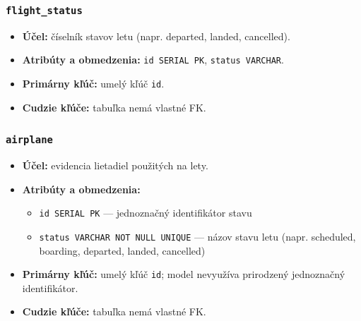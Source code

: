 \documentclass[11pt, a4paper]{article}
\begin{document}
\subsubsection*{\texttt{flight\_status}}
\begin{itemize}
    \item \textbf{Účel:} číselník stavov letu (napr. departed, landed, cancelled).
    \item \textbf{Atribúty a obmedzenia:} \texttt{id SERIAL PK}, \texttt{status VARCHAR}.
    \item \textbf{Primárny kľúč:} umelý kľúč \texttt{id}.
    \item \textbf{Cudzie kľúče:} tabuľka nemá vlastné FK.
\end{itemize}

\subsubsection*{\texttt{airplane}}
\begin{itemize}
    \item \textbf{Účel:} evidencia lietadiel použitých na lety.
    \item \textbf{Atribúty a obmedzenia:}
    \begin{itemize}
        \item \texttt{id SERIAL PK} --- jednoznačný identifikátor stavu
        \item \texttt{status VARCHAR NOT NULL UNIQUE} --- názov stavu letu (napr. scheduled, boarding, departed, landed, cancelled)
    \end{itemize}
    \item \textbf{Primárny kľúč:} umelý kľúč \texttt{id}; model nevyužíva prirodzený jednoznačný
        identifikátor.
    \item \textbf{Cudzie kľúče:} tabuľka nemá vlastné FK.
\end{itemize}
\end{document}
